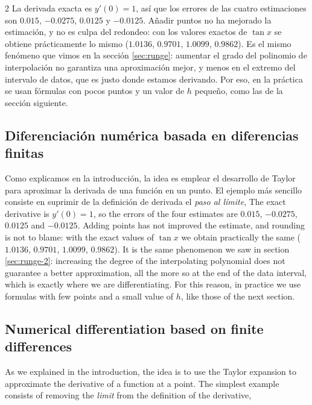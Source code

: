 \begin{paracol}{2}
La derivada exacta es $y'(0)=1$, así que los errores de las cuatro estimaciones son $0.015$, $-0.0275$, $0.0125$ y $-0.0125$. Añadir puntos no ha mejorado la estimación, y no es culpa del redondeo: con los valores exactos de $\tan x$ se obtiene prácticamente lo mismo ($1.0136$, $0.9701$, $1.0099$, $0.9862$). Es el mismo fenómeno que vimos en la sección \ref{sec:runge}: aumentar el grado del polinomio de interpolación no garantiza una aproximación mejor, y menos en el extremo del intervalo de datos, que es justo donde estamos derivando. Por eso, en la práctica se usan fórmulas con pocos puntos y un valor de $h$ pequeño, como las de la sección siguiente.

\subsection{Diferenciación numérica basada en diferencias finitas}
Como explicamos en la introducción, la idea es emplear el desarrollo de Taylor para aproximar la derivada de una función en un punto. El ejemplo más sencillo consiste en suprimir de la definición de derivada el \emph{paso al límite},
\switchcolumn
The exact derivative is $y'(0)=1$, so the errors of the four estimates are $0.015$, $-0.0275$, $0.0125$ and $-0.0125$. Adding points has not improved the estimate, and rounding is not to blame: with the exact values of $\tan x$ we obtain practically the same ($1.0136$, $0.9701$, $1.0099$, $0.9862$). It is the same phenomenon we saw in section \ref{sec:runge-2}: increasing the degree of the interpolating polynomial does not guarantee a better approximation, all the more so at the end of the data interval, which is exactly where we are differentiating. For this reason, in practice we use formulas with few points and a small value of $h$, like those of the next section.

\subsection{Numerical differentiation based on finite differences}
As we explained in the introduction, the idea is to use the Taylor expansion to approximate the derivative of a function at a point. The simplest example consists of removing the \emph{limit} from the definition of the derivative,
\end{paracol}
